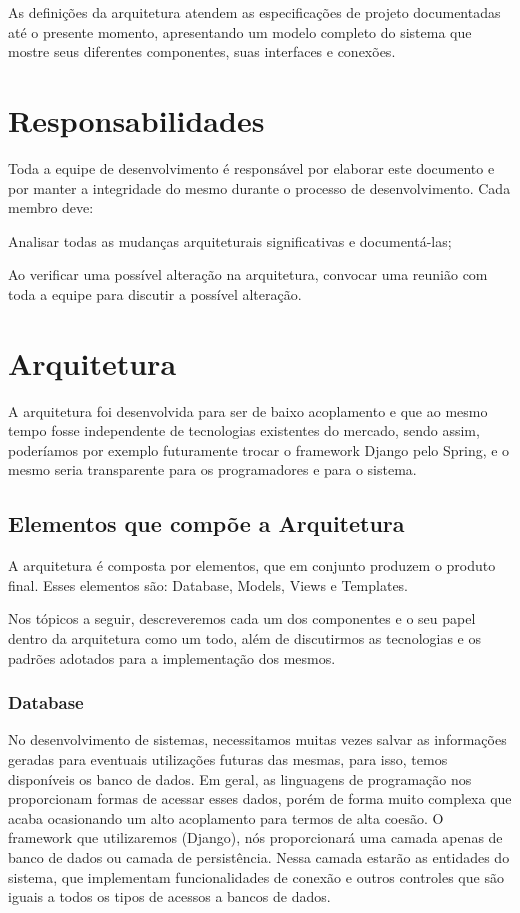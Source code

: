 As definições da arquitetura atendem as especificações de projeto documentadas 
até o presente momento, apresentando um modelo completo do sistema que mostre 
seus diferentes componentes, suas interfaces e conexões.

\section{Responsabilidades}
Toda a equipe de desenvolvimento é responsável por elaborar este documento  e 
por manter a integridade do mesmo durante o processo de desenvolvimento. Cada 
membro deve:
\begin{alineascomponto}
	\item Analisar todas as mudanças arquiteturais significativas e 
documentá-las;
    \item Ao verificar uma possível alteração na arquitetura, convocar uma 
reunião com toda a equipe para discutir a possível alteração. 
\end{alineascomponto}

\section{Arquitetura}
A arquitetura foi desenvolvida para ser de baixo acoplamento e que ao mesmo 
tempo fosse independente de tecnologias existentes do mercado, sendo assim, 
poderíamos por exemplo futuramente trocar o framework Django pelo Spring, e o 
mesmo seria transparente para os programadores e para o sistema.

\subsection{Elementos que compõe a Arquitetura}
A arquitetura é composta por elementos, que em conjunto produzem o produto 
final. Esses elementos são: Database, Models, Views e Templates.

Nos tópicos a seguir, descreveremos cada um dos componentes e o seu papel  dentro 
da arquitetura como um todo, além de discutirmos as tecnologias e os padrões 
adotados para a implementação dos mesmos.

\subsubsection{Database}
No desenvolvimento de sistemas, necessitamos muitas vezes salvar as informações 
geradas para eventuais utilizações futuras das mesmas, para isso, temos disponíveis os 
banco de dados. Em geral, as linguagens de programação nos proporcionam formas 
de acessar esses dados, porém de forma muito  complexa que acaba ocasionando um 
alto acoplamento para termos de alta coesão. O framework que utilizaremos (Django), nós 
proporcionar\'a uma camada apenas de banco de dados ou camada de persistência. Nessa camada estar\~ao as entidades do sistema, que implementam funcionalidades de conexão e outros controles que são 
iguais a todos os tipos de acessos a bancos de dados. 


